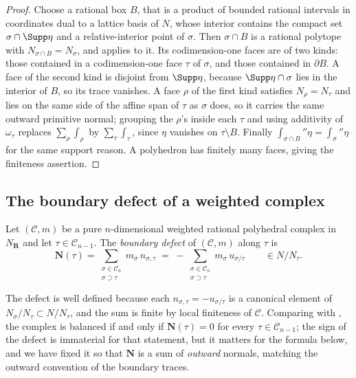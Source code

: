 \begin{proof}
Choose a rational box $B$, that is a product of bounded rational intervals
in coordinates dual to a lattice basis of $N$, whose interior contains the
compact set $\sigma\cap\Supp\eta$ and a relative-interior point of
$\sigma$.  Then $\sigma\cap B$ is a rational
polytope with $N_{\sigma\cap B}=N_\sigma$, and
 applies to it.  Its codimension-one faces are
of two kinds: those contained in a codimension-one face $\tau$ of $\sigma$,
and those contained in $\partial B$.  A face of the second kind is disjoint
from $\Supp\eta$, because $\Supp\eta\cap\sigma$ lies in the interior of
$B$, so its trace vanishes.  A face $\rho$ of the first kind satisfies
$N_\rho=N_\tau$ and lies on the same side of the affine span of $\tau$ as
$\sigma$ does, so it carries the same outward primitive normal; grouping the
$\rho$'s inside each $\tau$ and using additivity of $\omega_\tau$ replaces
$\sum_\rho\int_\rho$ by $\sum_\tau\int_\tau$, since $\eta$ vanishes on
$\tau\setminus B$.  Finally $\int_{\sigma\cap B}\dprime\eta
=\int_\sigma\dprime\eta$ for the same support reason.  A polyhedron has
finitely many faces, giving the finiteness assertion.
\end{proof}

\subsection{The boundary defect of a weighted complex}
\label{sec:ch11-defect}

\begin{definition}
\label{def:ch11-defect}
Let $(\mathscr C,m)$ be a pure $n$-dimensional weighted rational polyhedral
complex in $N_{\mathbf R}$ and let $\tau\in\mathscr C_{n-1}$.  The
\emph{boundary defect} of $(\mathscr C,m)$ along $\tau$ is
\[
 \mathbf N(\tau)
 =\sum_{\substack{\sigma\in\mathscr C_n\\ \sigma\supset\tau}}
    m_\sigma\,n_{\sigma,\tau}
 \;=\;-\sum_{\substack{\sigma\in\mathscr C_n\\ \sigma\supset\tau}}
    m_\sigma\,u_{\sigma/\tau}
 \qquad\in N/N_\tau .
\]
\end{definition}

The defect is well defined because each $n_{\sigma,\tau}=-u_{\sigma/\tau}$
is a canonical element of $N_\sigma/N_\tau\subset N/N_\tau$, and the sum is
finite by local finiteness of $\mathscr C$.  Comparing with
, the complex is balanced if and only if
$\mathbf N(\tau)=0$ for every $\tau\in\mathscr C_{n-1}$; the sign of the
defect is immaterial for that statement, but it matters for the formula
below, and we have fixed it so that $\mathbf N$ is a sum of \emph{outward}
normals, matching the outward convention of the boundary traces.

